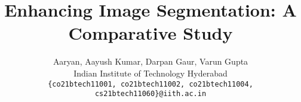 \documentclass[10pt,twocolumn,letterpaper]{article}
\title{Enhancing Image Segmentation: A Comparative Study}
\author{Aaryan,  \quad  Aayush Kumar, \quad  Darpan Gaur, \quad  Varun Gupta\\
Indian Institute of Technology Hyderabad\\
{\tt\small \{co21btech11001, co21btech11002, co21btech11004, cs21btech11060\}@iith.ac.in}
}
\begin{document}
\maketitle
    






{
    \small
    
    
}

% 
\end{document}
